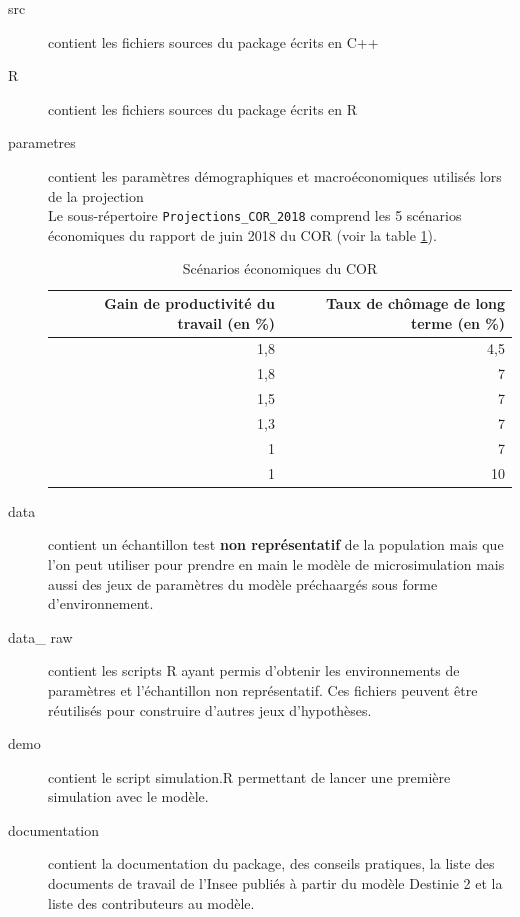	\begin{description}
		\item[src] contient les fichiers sources du package écrits en C++
		\item[R] contient les fichiers sources du package écrits en R
		\item[parametres] contient les paramètres démographiques et macroéconomiques utilisés lors de la projection\\
Le sous-répertoire {\tt Projections\_COR\_2018} comprend les 5 scénarios économiques du rapport de juin 2018 du COR (voir la table \ref{tab:hypscCOR}). 
\renewcommand{\arraystretch}{1.8}

\begin{table}[h]
  \centering
  \caption{Scénarios économiques du COR}
    \begin{tabular}{rr}
    \toprule
 Gain de productivité du travail (en \%) & Taux de chômage de long terme (en \%) \\
    \midrule
 1,8     & 4,5 \\
 1,8   & 7 \\
 1,5   & 7 \\
 1,3   & 7 \\
 1     & 7 \\
 1     & 10 \\
    \bottomrule
    \end{tabular}%
  \label{tab:hypscCOR}%
\end{table}%
		\item[data] contient un échantillon test \textbf{non représentatif} de la population mais que l'on peut utiliser pour prendre en main le modèle de microsimulation mais aussi des jeux de paramètres du modèle préchaargés sous forme d'environnement.
		\item[data\_ raw] contient les scripts R ayant permis d'obtenir les environnements de paramètres et l'échantillon non représentatif. Ces fichiers peuvent être réutilisés pour construire d'autres jeux d'hypothèses.
		\item[demo] contient le script simulation.R permettant de lancer une première simulation avec le modèle.
		\item[documentation] contient la documentation du package, des conseils pratiques, la liste des documents de travail de l'Insee publiés à partir du modèle Destinie 2 et la liste des contributeurs au modèle.
	\end{description}






